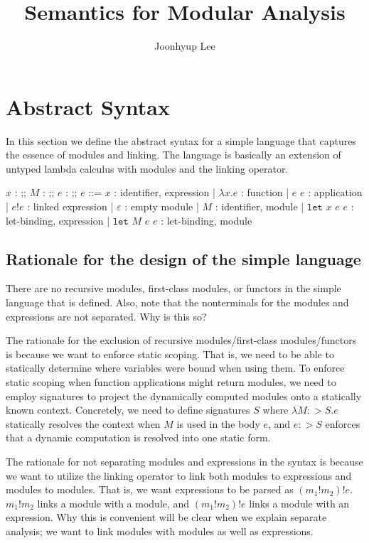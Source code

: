 \documentclass{article}
\title{Semantics for Modular Analysis}
\author{Joonhyup Lee}
\date{}
\theoremstyle{definition}
\newcommand*{\Expr}{\text{Expr}}
\newcommand*{\ExprVar}{\text{ExprVar}}
\newcommand*{\ModVar}{\text{ModVar}}
\newcommand*{\link}[2]{{#1}\mathtt{!}{#2}}
\newcommand*{\Let}{\mathtt{let}}
\begin{document}
\maketitle

\section{Abstract Syntax}

In this section we define the abstract syntax for a simple language that captures the essence of modules and linking.
The language is basically an extension of untyped lambda calculus with modules and the linking operator.

\begin{bnfgrammar}
  $x$ : \in \ExprVar
  ;;
  $M$ : \in \ModVar
  ;;
  $e$ : \in \Expr
  ;;
  $e$ ::= $x$ : identifier, expression
  | $\lambda x.e$ : function
  | $e$ $e$ : application
  | $\link{e}{e}$ : linked expression
  | $\varepsilon$ : empty module
  | $M$ : identifier, module
  | $\Let$ $x$ $e$ $e$ : let-binding, expression
  | $\Let$ $M$ $e$ $e$ : let-binding, module
\end{bnfgrammar}

\subsection{Rationale for the design of the simple language}

There are no recursive modules, first-class modules, or functors in the simple language that is defined.
Also, note that the nonterminals for the modules and expressions are not separated. Why is this so?

The rationale for the exclusion of recursive modules/first-class modules/functors is because we want to enforce static scoping.
That is, we need to be able to statically determine where variables were bound when using them.
To enforce static scoping when function applications might return modules, we need to employ signatures to project the dynamically computed modules onto a statically known context.
Concretely, we need to define signatures $S$ where $\lambda M:>S.e$ statically resolves the context when $M$ is used in the body $e$, and $e:>S$ enforces that a dynamic computation is resolved into one static form.

The rationale for not separating modules and expressions in the syntax is because we want to utilize the linking operator to link both modules to expressions and modules to modules.
That is, we want expressions to be parsed as $(m_1!m_2)!e$.
$\link{m_1}{m_2}$ links a module with a module, and $(m_1!m_2)!e$ links a module with an expression.
Why this is convenient will be clear when we explain separate analysis; we want to link modules with modules as well as expressions.
\end{document}
